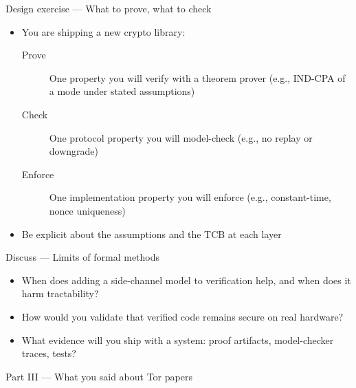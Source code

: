 \begin{frame}{Design exercise — What to prove, what to check}
  \begin{itemize}
    \item You are shipping a new crypto library:
      \begin{description}
        \item[Prove] One property you will verify with a theorem prover (e.g., IND-CPA of a mode under stated assumptions)
        \item[Check] One protocol property you will model-check (e.g., no replay or downgrade)
        \item[Enforce] One implementation property you will enforce (e.g., constant-time, nonce uniqueness)
      \end{description}
    \item Be explicit about the assumptions and the TCB at each layer
  \end{itemize}
\end{frame}

\begin{frame}{Discuss — Limits of formal methods}
  \begin{itemize}
    \item When does adding a side-channel model to verification help, and when does it harm tractability?
    \item How would you validate that verified code remains secure on real hardware?
    \item What evidence will you ship with a system: proof artifacts, model-checker traces, tests?
  \end{itemize}
\end{frame}

\begin{frame}{Part III — What you said about Tor papers}
\end{frame}

